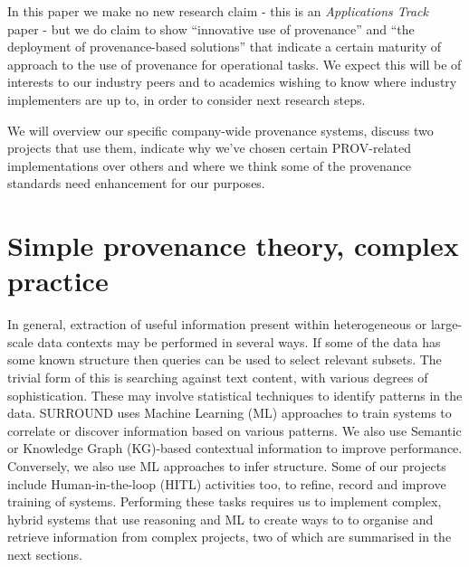 \documentclass[letterpaper,twocolumn,10pt]{article}
\begin{document}
In this paper we make no new research claim - this is an \textit{Applications Track} paper - but we do claim 
to show ``innovative use of provenance'' and ``the deployment of provenance-based solutions'' that indicate
a certain maturity of approach to the use of provenance for operational tasks. We expect this will be of 
interests to our industry peers and to academics wishing to know where industry implementers are up to,
in order to consider next research steps.

We will overview our specific company-wide provenance systems, discuss two projects that use them, indicate 
why we've chosen certain PROV-related implementations over others and where we think some of the provenance
standards need enhancement for our purposes.


\section{Simple provenance theory, complex practice}
In general, extraction of useful information present within heterogeneous or large-scale data contexts may be performed in several 
ways. If some of the data has some known structure then queries can be used to select relevant subsets. The trivial form 
of this is searching against text content, with various degrees of sophistication. These may involve statistical 
techniques to identify patterns in the data. SURROUND uses Machine Learning (ML) approaches to train systems to correlate or 
discover information based on various patterns. We also use Semantic or Knowledge Graph (KG)-based contextual information to 
improve performance. Conversely, we also use ML approaches to infer structure. Some of our projects
include Human-in-the-loop (HITL) activities too, to refine, record and improve training of systems. Performing these tasks 
requires us to implement complex, hybrid systems that use reasoning and ML to create ways to to organise and retrieve 
information from complex projects, two of which are summarised in the next sections.  

\end{document}
